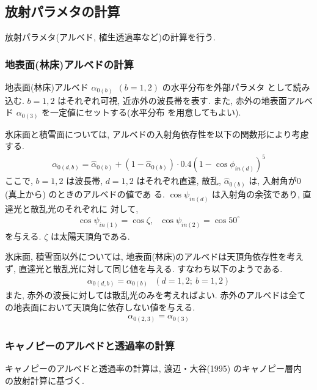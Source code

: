 \subsection{放射パラメタの計算}

放射パラメタ(アルベド, 植生透過率など)の計算を行う. 

\subsubsection{地表面(林床)アルベドの計算}

地表面(林床)アルベド $\alpha_{0(b)}\ \ (b=1,2)$ の水平分布を外部パラメタ
として読み込む. $b=1, 2$ はそれぞれ可視, 近赤外の波長帯を表す. 
また, 赤外の地表面アルベド $\alpha_{0(3)}$ を一定値にセットする(水平分布
を用意してもよい). 

氷床面と積雪面については, アルベドの入射角依存性を以下の関数形により考慮
する. 
\begin{eqnarray}
 \alpha_{0(d,b)} = \hat{\alpha}_{0(b)} + ( 1 - \hat{\alpha}_{0(b)} ) 
                         \cdot 0.4 ( 1 - \cos \phi_{in(d)} )^5
\end{eqnarray}
ここで, $b=1,2$ は波長帯, $d=1,2$ はそれぞれ直達, 散乱,
$\hat{\alpha}_{0(b)}$ は, 入射角が$0$ (真上から) のときのアルベドの値であ
る. $\cos \psi_{in(d)}$ は入射角の余弦であり, 直達光と散乱光のそれぞれに
対して, 
\begin{eqnarray}
 \cos\psi_{in(1)} = \cos\zeta, \ \ \ 
 \cos\psi_{in(2)} = \cos 50^{\circ}
\end{eqnarray}
を与える. $\zeta$ は太陽天頂角である. 

氷床面, 積雪面以外については, 地表面(林床)のアルベドは天頂角依存性を考え
ず, 直達光と散乱光に対して同じ値を与える. すなわち以下のようである. 
\begin{eqnarray}
 \alpha_{0(d,b)} = \alpha_{0(b)}\ \ \ (d=1,2;\ b=1,2)
\end{eqnarray}
また, 赤外の波長に対しては散乱光のみを考えればよい. 赤外のアルベドは全て
の地表面において天頂角に依存しない値を与える. 
\begin{eqnarray}
 \alpha_{0(2,3)} = \alpha_{0(3)}
\end{eqnarray}

\subsubsection{キャノピーのアルベドと透過率の計算}

キャノピーのアルベドと透過率の計算は, 渡辺・大谷(1995) のキャノピー層内
の放射計算に基づく. 

